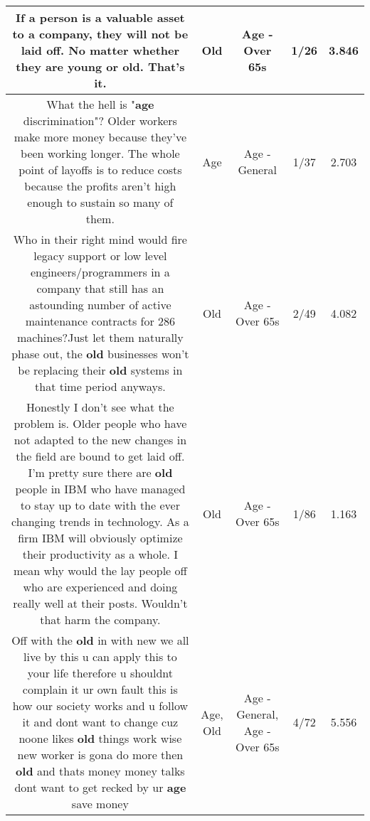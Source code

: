 \documentclass[11pt]{article}
\newlength\mylength
\begin{document}
\begin{center}
\begin{longtable}{|C{.65\mylength}|C{.30\mylength}|C{.12\mylength}|C{.12\mylength}|C{.12\mylength}|}
  \small If a person is a valuable asset to a company, they will not be laid off. No matter whether they are young or \textbf{old}. That's it.\normalsize   & Old & Age - Over 65s & 1/26 & 3.846 \\  \hline
  \small What the hell is "\textbf{age} discrimination"? Older workers make more money because they've been working longer. The whole point of layoffs is to reduce costs because the profits aren't high enough to sustain so many of them.\normalsize   & Age & Age - General & 1/37 & 2.703 \\  \hline
  \small Who in their right mind would fire legacy support or low level engineers/programmers in a company that still has an astounding number of active maintenance contracts for 286 machines?Just let them naturally phase out, the \textbf{old} businesses won't be replacing their \textbf{old} systems in that time period anyways.\normalsize   & Old & Age - Over 65s & 2/49 & 4.082 \\  \hline
  \small Honestly I don't see what the problem is. Older people who have not adapted to the new changes in the field are bound to get laid off. I'm pretty sure there are \textbf{old} people in IBM who have managed to stay up to date with the ever changing trends in technology. As a firm IBM will obviously optimize their productivity as a whole. I mean why would the lay people off who are experienced and doing really well at their posts. Wouldn't that harm the company.\normalsize   & Old & Age - Over 65s & 1/86 & 1.163 \\  \hline
  \small Off with the \textbf{old} in with new we all live by this u can apply this to your life therefore u shouldnt complain it ur own fault this is how our society works and u follow it and dont want to change cuz noone likes \textbf{old} things work wise new worker is gona do more then \textbf{old} and thats money money talks dont want to get recked by ur \textbf{age} save money\normalsize   & Age, Old & Age - General, Age - Over 65s & 4/72 & 5.556 \\  \hline

\end{longtable}
\end{center}
\end{document}
